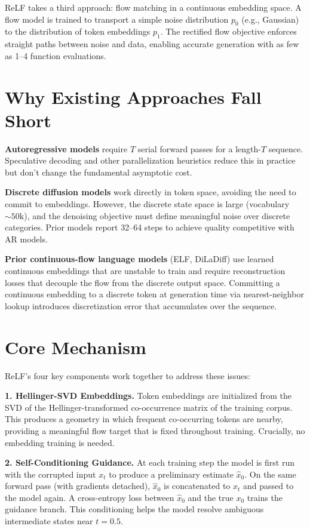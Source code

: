 \documentclass[10pt,twocolumn]{article}
\begin{document}
ReLF takes a third approach: flow matching in a continuous embedding
space. A flow model is trained to transport a simple noise distribution
$p_0$ (e.g., Gaussian) to the distribution of token embeddings $p_1$.
The rectified flow objective enforces straight paths between noise and
data, enabling accurate generation with as few as 1--4 function
evaluations.

\section{Why Existing Approaches Fall Short}

\textbf{Autoregressive models} require $T$ serial forward passes for a
length-$T$ sequence. Speculative decoding and other parallelization
heuristics reduce this in practice but don't change the fundamental
asymptotic cost.

\textbf{Discrete diffusion models} work directly in token space,
avoiding the need to commit to embeddings. However, the discrete state
space is large (vocabulary $\sim 50\text{k}$), and the denoising
objective must define meaningful noise over discrete categories. Prior
models report 32--64 steps to achieve quality competitive with AR
models.

\textbf{Prior continuous-flow language models} (ELF, DiLaDiff) use
learned continuous embeddings that are unstable to train and require
reconstruction losses that decouple the flow from the discrete output
space. Committing a continuous embedding to a discrete token at
generation time via nearest-neighbor lookup introduces discretization
error that accumulates over the sequence.

\section{Core Mechanism}

ReLF's four key components work together to address these issues:

\textbf{1. Hellinger-SVD Embeddings.} Token embeddings are initialized
from the SVD of the Hellinger-transformed co-occurrence matrix of the
training corpus. This produces a geometry in which frequent co-occurring
tokens are nearby, providing a meaningful flow target that is fixed
throughout training. Crucially, no embedding training is needed.

\textbf{2. Self-Conditioning Guidance.} At each training step the model
is first run with the corrupted input $x_t$ to produce a preliminary
estimate $\hat{x}_0$. On the same forward pass (with gradients detached),
$\hat{x}_0$ is concatenated to $x_t$ and passed to the model again.
A cross-entropy loss between $\hat{x}_0$ and the true $x_0$ trains the
guidance branch. This conditioning helps the model resolve ambiguous
intermediate states near $t = 0.5$.
\end{document}
